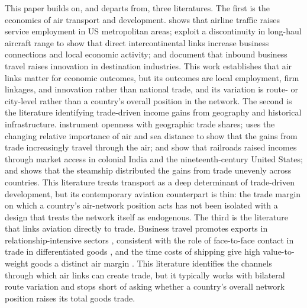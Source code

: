 This paper builds on, and departs from, three literatures. The first is the economics of air transport and development. \citet{Brueckner_2003} shows that airline traffic raises service employment in US metropolitan areas; \citet{Campante_2017} exploit a discontinuity in long-haul aircraft range to show that direct intercontinental links increase business connections and local economic activity; and \citet{Hovhannisyan_2015} document that inbound business travel raises innovation in destination industries. This work establishes that air links matter for economic outcomes, but its outcomes are local employment, firm linkages, and innovation rather than national trade, and its variation is route- or city-level rather than a country's overall position in the network. The second is the literature identifying trade-driven income gains from geography and historical
infrastructure. \citet{Frankel_1999} instrument openness with geographic trade shares; \citet{Feyrer_2019} uses the changing relative importance of air and sea distance to show that the gains from trade increasingly travel
through the air; \citet{Donaldson_2018} and \citet{Donaldson_2016} show that railroads raised incomes through market access in colonial India and the nineteenth-century United States; and \citet{Pascali_2017} shows that
the steamship distributed the gains from trade unevenly across countries. This literature treats transport as a deep determinant of trade-driven development, but its contemporary aviation counterpart is thin: the trade
margin on which a country's air-network position acts has not been isolated with a design that treats the network itself as endogenous. The third is the literature that links aviation directly to trade. Business travel
promotes exports in relationship-intensive sectors \citep{Cristea_2011,Startz_2016,Soderlund_2023}, consistent with the role of face-to-face contact in trade in differentiated goods \citep{Rauch_1999}, and the time costs of shipping give high value-to-weight goods a distinct air margin \citep{Hummels_2013}. This literature identifies the channels through which air links can create trade, but it typically works with bilateral route variation and stops short of asking whether a country's overall network position raises its total goods trade. 

